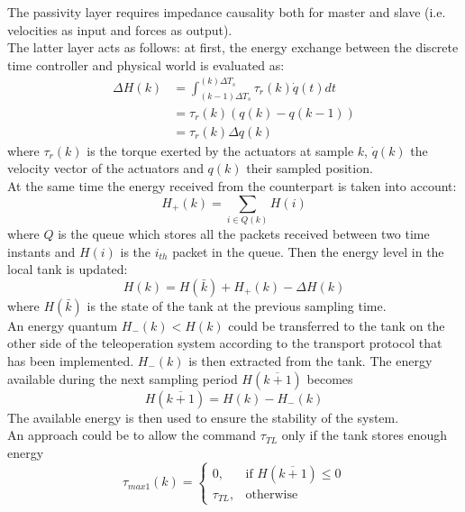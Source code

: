 The passivity layer requires impedance causality both for master and slave (i.e. velocities as input and forces as output).\\
The latter layer acts as follows: at first, the energy exchange between the discrete time controller and physical world is evaluated as:
\begin{equation}
	\begin{split}
		\Delta H(k) & = \int_{(k-1)\Delta T_{s}}^{(k)\Delta T_{s}} \tau_{r}(k)\dot{q}(t)dt\\
		& =	\tau_{r}(k)(q(k)-q(k-1))\\
		& =\tau_{r}(k) \Delta q(k)
	\end{split}
\end{equation}
where $\tau_{r}(k)$ is the torque exerted by the actuators at sample $k$, $\dot{q}(k)$ the velocity vector of the actuators and $q(k)$ their sampled position.\\
At the same time the energy received from the counterpart is taken into account:
\begin{equation} 
	H_{+}(k) = \sum_{i\in Q(k)}H(i)
\end{equation}
where $Q$ is the queue which stores all the packets received between two time instants and $H(i)$ is the $i_{th}$ packet in the queue.
Then the energy level in the local tank is updated:
\begin{equation}
	H(k)= H(\bar{k}) + H_{+}(k) - \Delta H(k)
\end{equation}
where $H(\bar{k})$ is the state of the tank at the previous sampling time.\\
An energy quantum $H_{-}(k) < H(k)$ could be transferred to the tank on the other side of the teleoperation system according to the transport protocol that has been implemented. $H_{-}(k)$ is then extracted from the tank.
The energy available during the next sampling period 	$H(\overline{k+1})$ becomes
\begin{equation}
	H(\overline{k+1}) = H(k) - H_{-}(k)
\end{equation} 
The available energy is then used to ensure the stability of the system.\\
An approach could be to allow the command $\tau_{TL}$ only if the tank stores enough energy
\begin{equation*}
		\tau_{max1}(k) =
	\begin{cases}
	0, & \mbox{if } H(\overline{k+1})  \leq 0\\
	\tau_{TL}, & \mbox{otherwise}
	\end{cases}
\end{equation*}
